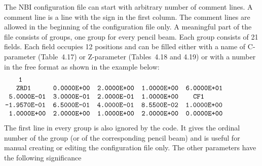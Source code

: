 The NBI configuration file can start with arbitrary number of comment
lines. 
A comment line is a line with the sign  in the first column.
The comment lines are allowed in the beginning of the
configuration file only.
A meaningful part of the file consists of  groups, one group
for every pencil beam. Each group consists of 21 fields. 
Each field occupies 12 positions and can be filled either with a name of
C-parameter (Table~4.17) or Z-parameter (Tables~4.18 and 4.19) or with a
number in the free format as shown in the example below:
\begin{equation}\label{NBI_conf}\begin{tabular}{l}\tt\hspace*{2ex}
1						\\ \tt%
~~ZRD1~~~~~~0.0000E+00~~2.0000E+00~~1.0000E+00~~6.0000E+01
\\						 \tt%
5.0000E-01~~3.0000E-01~~2.0000E-01~~1.0000E+00~~~~CF1
\\						 \tt\hspace*{-2.5ex}
-1.9570E-01~~6.5000E-01~~4.0000E-01~~8.5500E-02~~1.0000E+00
\\						 \tt%
1.0000E+00~~2.0000E+00~~1.0000E+00~~2.0000E+00~~0.0000E+00
\end{tabular}\hphantom{AAAAAA}\end{equation}
The first line in every group is also ignored by the code.
It gives the ordinal number of the group (or of the corresponding pencil
beam) and is useful for manual creating or editing the configuration
file only. 
The other parameters have the following significance

